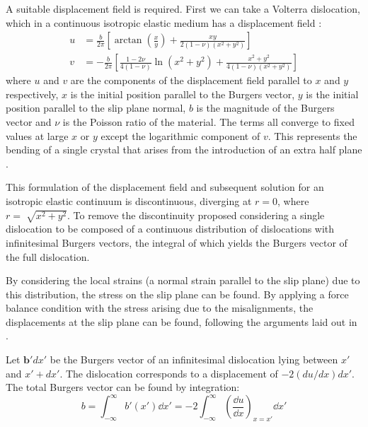 A suitable displacement field is required. First we can take a Volterra dislocation, which in a continuous isotropic elastic medium has a displacement field \cite{Hirth1982Straight_dislocs}:
\begin{subequations}
\begin{align}
u &= \frac{b}{2\pi}\left[ \arctan\left(\frac{x}{y}\right) + \frac{xy}{2(1-\nu)(x^2 + y^2)} \right] \\[0.5ex]
v &= -\frac{b}{2\pi} \left[ \frac{1-2\nu}{4(1-\nu)} \ln(x^2 + y^2) + \frac{x^2 + y^2}{4(1-\nu)(x^2 + y^2)} \right]
\end{align}
\end{subequations}
where $u$ and $v$ are the components of the displacement field parallel to $x$ and $y$ respectively, $x$ is the initial position parallel to the Burgers vector, $y$ is the initial position parallel to the slip plane normal, $b$ is the magnitude of the Burgers vector and $\nu$ is the Poisson ratio of the material. The terms all converge to fixed values at large $x$ or $y$ except the logarithmic component of $v$. This represents the bending of a single crystal that arises from the introduction of an extra half plane \cite{Hirth1982Straight_dislocs}.

This formulation of the displacement field and subsequent solution for an isotropic elastic continuum is discontinuous, diverging at $r=0$, where $r=\sqrt[]{x^2+y^2}$. To remove the discontinuity \citet{Eshelby1949} proposed considering a single dislocation to be composed of a continuous distribution of dislocations with infinitesimal Burgers vectors, the integral of which yields the Burgers vector of the full dislocation. 

By considering the local strains (a normal strain parallel to the slip plane) due to this distribution, the stress on the slip plane can be found. By applying a force balance condition with the stress arising due to the misalignments, the displacements at the slip plane can be found, following the arguments laid out in \cite{Hirth_Lothe1982lattice_periodicity}. 

Let $\mathbf{b}'dx'$ be the Burgers vector of an infinitesimal dislocation lying between $x'$ and $x'+dx'$. The dislocation corresponds to a displacement of $-2(du/dx)dx'$. The total Burgers vector can be found by integration:
\begin{equation}
b = \int_{-\infty}^{\infty} b'(x') \dd x' = -2\int^{\infty}_{-\infty} \left( \! \frac{\dd u}{\dd x} \right)_{x=x'} \dd x' 
\end{equation}

